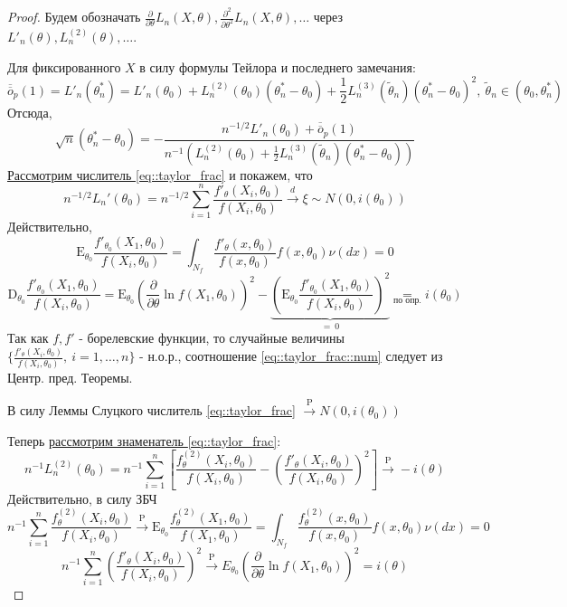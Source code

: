 \documentclass[12pt]{article}
\theoremstyle{basic_theorem}
\theoremstyle{name_theorem}
\def\E{
    \mathrm{E}
}
\def\D{
    \mathrm{D}
}
\def\P{
    \mathrm{P}
}
\def\littleO{
    \overline{\overline{o}}
}
\begin{document}
    \begin{proof}
        Будем обозначать $\frac{\partial}{\partial\theta}L_n(X, \theta), \frac{\partial^2}{\partial\theta^2}L_n(X, \theta), \ldots$
        через $L'_n(\theta), L^{(2)}_n(\theta), \ldots$.

        Для фиксированного $X$ в силу формулы Тейлора и последнего замечания:
        $$\littleO_p(1) = L'_n(\theta^*_n) = L'_n(\theta_0) + L^{(2)}_n(\theta_0)(\theta^*_n - \theta_0) + 
        \frac{1}{2}L_n^{(3)}(\widetilde{\theta}_n)(\theta^*_n - \theta_0)^2,\ \widetilde{\theta}_n \in(\theta_0, \theta_n^*)$$
        Отсюда,
        \begin{equation}
            \label{eq::taylor_frac}
            \sqrt{n}(\theta^*_n - \theta_0) = -\frac{n^{-1/2} L'_n(\theta_0) + \littleO_p(1)}{n^{-1}(L^{(2)}_n(\theta_0) + \frac{1}{2}L^{(3)}_n(\widetilde{\theta}_n)(\theta^*_n - \theta_0))}
        \end{equation}
        \underline{Рассмотрим числитель \eqref{eq::taylor_frac}} и покажем, что
        \begin{equation}
            \label{eq::taylor_frac::num}
            n^{-1/2}L_n'(\theta_0) = n^{-1/2}\sum_{i=1}^n \frac{f'_\theta(X_i, \theta_0)}{f(X_i, \theta_0)} \xrightarrow{d} \xi\sim N(0, i(\theta_0))
        \end{equation}
        Действительно, 
        $$\E_{\theta_0}\frac{f'_{\theta_0}(X_1, \theta_0)}{f(X_i, \theta_0)} = \int_{N_f}\frac{f'_\theta(x, \theta_0)}{f(x,\theta_0)} f(x,\theta_0) \nu(dx) = 0$$
        $$\D_{\theta_0}\frac{f'_{\theta_0}(X_1, \theta_0)}{f(X_i, \theta_0)} = \E_{\theta_0}\left(\frac{\partial}{\partial\theta}\ln f(X_1, \theta_0)\right)^2 - \underbrace{\left(\E_{\theta_0}\frac{f'_{\theta_0}(X_1, \theta_0)}{f(X_i, \theta_0)}\right)^2 }_{ =\ 0} \underset{\text{по опр.}}{=} i(\theta_0)$$
        Так как $f, f'$ - борелевские функции, то случайные величины $\{\frac{f'_\theta(X_i, \theta_0)}{f(X_i, \theta_0)},\ i=1,\ldots,n\}$ - н.о.р.,
        соотношение \eqref{eq::taylor_frac::num} следует из Центр. пред. Теоремы.
        
        В силу Леммы Слуцкого числитель \eqref{eq::taylor_frac} $\xrightarrow{\P} N(0, i(\theta_0))$

        Теперь \underline{рассмотрим знаменатель \eqref{eq::taylor_frac}}:
        \begin{equation}
            \label{eq::taylor_frac::den}
            n^{-1}L_n^{(2)}(\theta_0) = n^{-1}\sum^n_{i=1}\left[ \frac{f^{(2)}_\theta(X_i, \theta_0)}{f(X_i, \theta_0)} - \left(\frac{f'_\theta(X_i, \theta_0)}{f(X_i, \theta_0)}\right)^2\right] \xrightarrow{\P} -i(\theta)
        \end{equation}
        Действительно, в силу ЗБЧ
        $$n^{-1}\sum^n_{i=1} \frac{f^{(2)}_\theta(X_i, \theta_0)}{f(X_i, \theta_0)} \xrightarrow{\P} \E_{\theta_0}\frac{f^{(2)}_\theta(X_1, \theta_0)}{f(X_1, \theta_0)} = \int_{N_f} \frac{f^{(2)}_\theta(x, \theta_0)}{f(x, \theta_0)} f(x, \theta_0) \nu(dx) = 0$$
        $$n^{-1}\sum^n_{i=1} \left(\frac{f'_\theta(X_i, \theta_0)}{f(X_i, \theta_0)}\right)^2 \xrightarrow{\P} E_{\theta_0} \left(\frac{\partial}{\partial\theta} \ln f(X_1, \theta_0)\right)^2 = i(\theta)$$
    

\end{proof}
\end{document}
